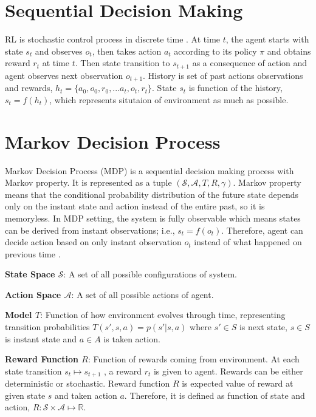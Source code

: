 \section{Sequential Decision Making}

RL is stochastic control process in discrete time \cite{sutton_reinforcement_1998}.
At time $t$, the agent starts with state $s_t$ and observes $o_t$, then takes action $a_t$ according to its policy $\pi$ and obtains reward $r_t$ at time $t$. Then state transition to $s_{t+1}$ as a consequence of action and agent observes next observation $o_{t+1}$. History is set of past actions observations and rewards, $h_t=\{ a_0, o_0, r_0, ... a_t, o_t, r_t\}$. State $s_t$ is function of the history, $s_t=f(h_t)$, which represents situtaion of environment as much as possible.

\section{Markov Decision Process}
\label{sec:mdp}

Markov Decision Process (MDP) is a sequential decision making process with Markov property. It is represented as a tuple $(\mathcal{S},\mathcal{A},T,R,\gamma)$. Markov property means that the conditional probability distribution of the future state depends only on the instant state and action instead of the entire past, so it is memoryless. In MDP setting, the system is fully observable which means states can be derived from instant observations; i.e., $s_t=f(o_t)$. Therefore, agent can decide action based on only instant observation $o_t$ instead of what happened on previous time \cite{francois-lavet_introduction_2018}.

\textbf{State Space $\mathcal{S}$}: A set of all possible configurations of system. 

\textbf{Action Space $\mathcal{A}$}: A set of all possible actions of agent.

\textbf{Model $T$}: Function of how environment evolves through time, representing transition probabilities $T(s',s,a) = p(s'|s,a)$ where $s' \in S$ is next state, $s \in S$ is instant state and $a \in A$ is taken action. 

\textbf{Reward Function $R$}: Function of rewards coming from environment. At each state transition $s_t \mapsto s_{t+1}$ , a reward $r_t$ is given to agent. Rewards can be either deterministic or stochastic. Reward function $R$ is expected value of reward at given state $s$ and taken action $a$. Therefore, it is defined as function of state and action, $R \colon \mathcal{S} \times \mathcal{A} \mapsto \mathbb{R}$.


